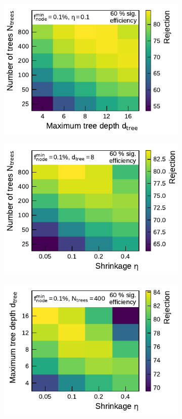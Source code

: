 \begin{figure}[ht]
  \begin{subfigure}[t]{0.48\textwidth}
    \centering
    \includegraphics{./figures/bdt_perf/gridsearch_1p/scan_MaxDepth_NTrees.pdf}
  \end{subfigure}\hfill
  \begin{subfigure}[t]{0.48\textwidth}
    \centering
    \includegraphics{./figures/bdt_perf/gridsearch_1p/scan_Shrinkage_NTrees.pdf}
  \end{subfigure}
  \begin{subfigure}[t]{0.48\textwidth}
    \centering
    \includegraphics{./figures/bdt_perf/gridsearch_1p/scan_Shrinkage_MaxDepth.pdf}

\end{subfigure}
\end{figure}
